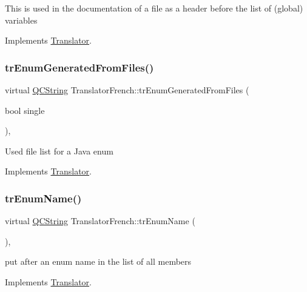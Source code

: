 This is used in the documentation of a file as a header before the list of (global) variables 

Implements \mbox{\hyperlink{class_translator}{Translator}}.

\mbox{\label{class_translator_french_a23de3cb759bd7c5f5305f3a0bf14e1ee}} 
\subsubsection{\texorpdfstring{trEnumGeneratedFromFiles()}{trEnumGeneratedFromFiles()}}
{\footnotesize\ttfamily virtual \mbox{\hyperlink{class_q_c_string}{Q\+C\+String}} Translator\+French\+::tr\+Enum\+Generated\+From\+Files (\begin{DoxyParamCaption}\item[{bool}]{single }\end{DoxyParamCaption})\hspace{0.3cm}{\ttfamily [inline]}, {\ttfamily [virtual]}}

Used file list for a Java enum 

Implements \mbox{\hyperlink{class_translator}{Translator}}.

\mbox{\label{class_translator_french_ac5127a4b11e7adbbdbcc4aca18dead29}} 
\subsubsection{\texorpdfstring{trEnumName()}{trEnumName()}}
{\footnotesize\ttfamily virtual \mbox{\hyperlink{class_q_c_string}{Q\+C\+String}} Translator\+French\+::tr\+Enum\+Name (\begin{DoxyParamCaption}{ }\end{DoxyParamCaption})\hspace{0.3cm}{\ttfamily [inline]}, {\ttfamily [virtual]}}

put after an enum name in the list of all members 

Implements \mbox{\hyperlink{class_translator}{Translator}}.

\mbox{\label{class_translator_french_acbe7d81374717790234bfc5988b00bc9}} 
